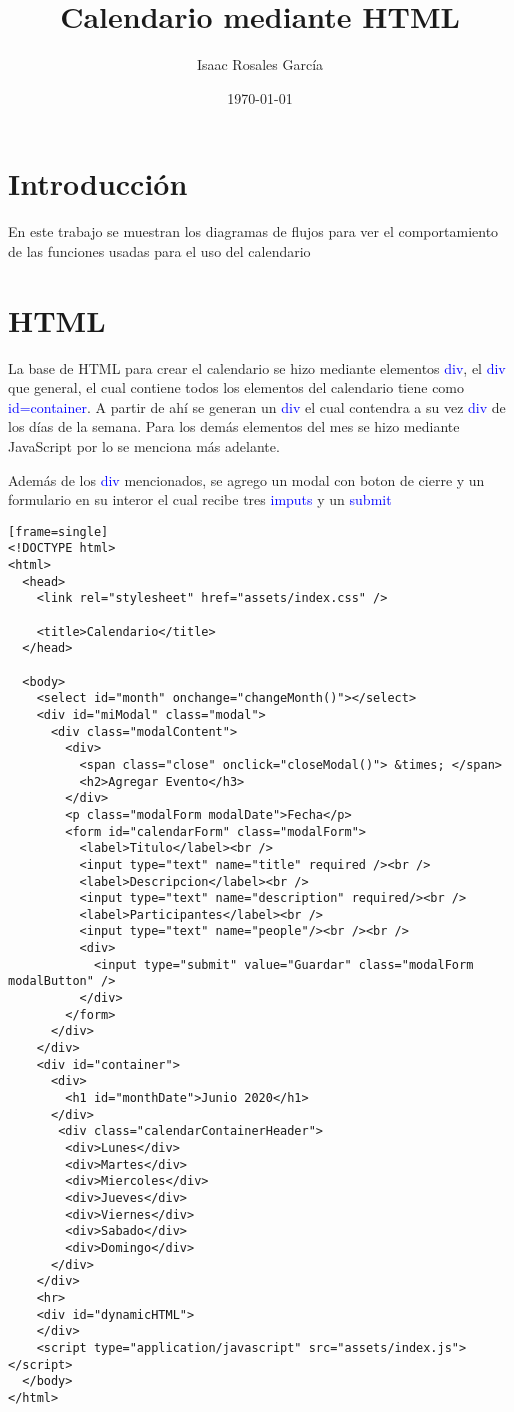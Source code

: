\documentclass[12pt]{article}
\title{Calendario mediante HTML}
\author{Isaac Rosales García }
\date{\today}
\begin{document}
\maketitle
\tableofcontents

\section{Introducción}
En este trabajo se muestran los diagramas de flujos para ver el comportamiento de las funciones usadas para el uso del calendario

\section{HTML}
La base de HTML para crear el calendario se hizo mediante elementos \textcolor{blue}{div}, el \textcolor{blue}{div} que general, el cual contiene todos los elementos del calendario  tiene como \textcolor{blue}{id=container}.
A partir de ahí se generan un \textcolor{blue}{div} el cual contendra a su vez \textcolor{blue}{div} de los días de la semana. Para los demás elementos del mes se hizo mediante JavaScript por lo se menciona más adelante.

Además de los \textcolor{blue}{div} mencionados, se agrego un modal con boton de cierre y un formulario en su interor el cual recibe tres \textcolor{blue}{imputs} y un \textcolor{blue}{submit}
\begin{lstlisting}[style=htmlcssjs][frame=single]
<!DOCTYPE html>
<html>
  <head>
    <link rel="stylesheet" href="assets/index.css" />

    <title>Calendario</title>
  </head>

  <body>
    <select id="month" onchange="changeMonth()"></select>
    <div id="miModal" class="modal">
      <div class="modalContent">
        <div>
          <span class="close" onclick="closeModal()"> &times; </span>
          <h2>Agregar Evento</h3>
        </div>
        <p class="modalForm modalDate">Fecha</p>
        <form id="calendarForm" class="modalForm">
          <label>Titulo</label><br />
          <input type="text" name="title" required /><br />
          <label>Descripcion</label><br />
          <input type="text" name="description" required/><br />
          <label>Participantes</label><br />
          <input type="text" name="people"/><br /><br />
          <div>
            <input type="submit" value="Guardar" class="modalForm modalButton" />
          </div>
        </form>
      </div>
    </div>
    <div id="container">
      <div>
        <h1 id="monthDate">Junio 2020</h1>
      </div>
       <div class="calendarContainerHeader">
        <div>Lunes</div>
        <div>Martes</div>
        <div>Miercoles</div>
        <div>Jueves</div>
        <div>Viernes</div>
        <div>Sabado</div>
        <div>Domingo</div>
      </div>
    </div>
    <hr>
    <div id="dynamicHTML">
    </div>
    <script type="application/javascript" src="assets/index.js"></script>
  </body>
</html>
\end{lstlisting}
\end{document}
